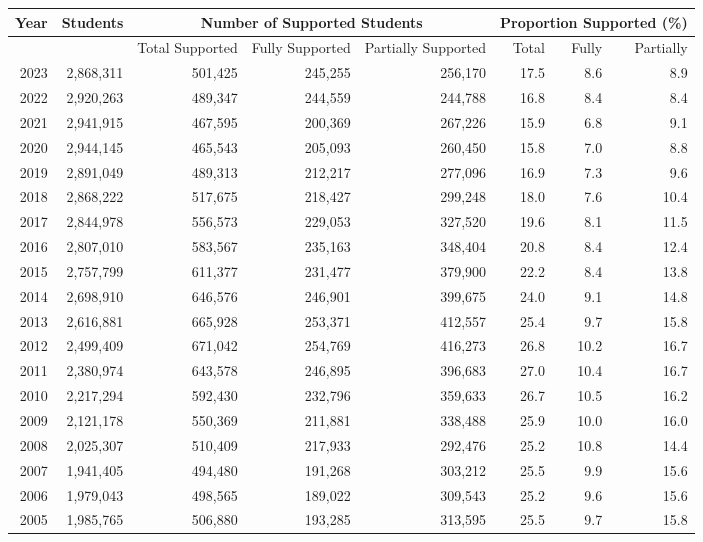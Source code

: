 \begin{landscape}
\setlength{\tabcolsep}{4pt}
\renewcommand{\arraystretch}{1.25}
\begin{table}
\centering
\begin{tabular}{rrrrrrrr}
\toprule
Year & Students & \multicolumn{3}{|c|}{Number of Supported Students} & \multicolumn{3}{c}{Proportion Supported (\%)} \\
\midrule
 & & Total Supported & Fully Supported & Partially Supported & Total & Fully & Partially \\
\midrule
2023 & 2,868,311 & 501,425 & 245,255 & 256,170 & 17.5 & 8.6 & 8.9 \\
2022 & 2,920,263 & 489,347 & 244,559 & 244,788 & 16.8 & 8.4 & 8.4 \\
2021 & 2,941,915 & 467,595 & 200,369 & 267,226 & 15.9 & 6.8 & 9.1 \\
2020 & 2,944,145 & 465,543 & 205,093 & 260,450 & 15.8 & 7.0 & 8.8 \\
2019 & 2,891,049 & 489,313 & 212,217 & 277,096 & 16.9 & 7.3 & 9.6 \\
2018 & 2,868,222 & 517,675 & 218,427 & 299,248 & 18.0 & 7.6 & 10.4 \\
2017 & 2,844,978 & 556,573 & 229,053 & 327,520 & 19.6 & 8.1 & 11.5 \\
2016 & 2,807,010 & 583,567 & 235,163 & 348,404 & 20.8 & 8.4 & 12.4 \\
2015 & 2,757,799 & 611,377 & 231,477 & 379,900 & 22.2 & 8.4 & 13.8 \\
2014 & 2,698,910 & 646,576 & 246,901 & 399,675 & 24.0 & 9.1 & 14.8 \\
2013 & 2,616,881 & 665,928 & 253,371 & 412,557 & 25.4 & 9.7 & 15.8 \\
2012 & 2,499,409 & 671,042 & 254,769 & 416,273 & 26.8 & 10.2 & 16.7 \\
2011 & 2,380,974 & 643,578 & 246,895 & 396,683 & 27.0 & 10.4 & 16.7 \\
2010 & 2,217,294 & 592,430 & 232,796 & 359,633 & 26.7 & 10.5 & 16.2 \\
2009 & 2,121,178 & 550,369 & 211,881 & 338,488 & 25.9 & 10.0 & 16.0 \\
2008 & 2,025,307 & 510,409 & 217,933 & 292,476 & 25.2 & 10.8 & 14.4 \\
2007 & 1,941,405 & 494,480 & 191,268 & 303,212 & 25.5 & 9.9 & 15.6 \\
2006 & 1,979,043 & 498,565 & 189,022 & 309,543 & 25.2 & 9.6 & 15.6 \\
2005 & 1,985,765 & 506,880 & 193,285 & 313,595 & 25.5 & 9.7 & 15.8 \\

\end{tabular}
\end{table}
\end{landscape}
